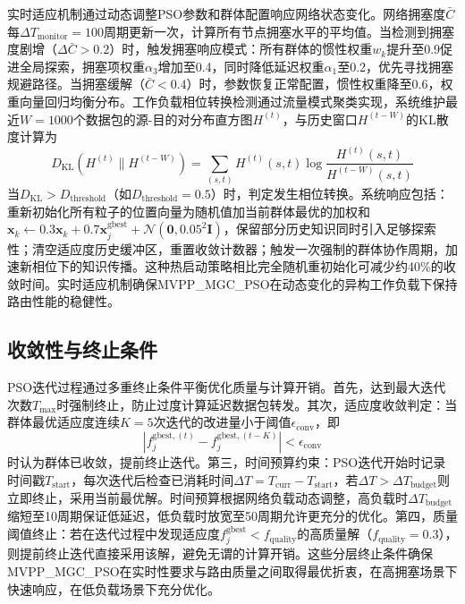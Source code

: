 \documentclass[11pt,a4paper]{article}
\begin{document}
实时适应机制通过动态调整PSO参数和群体配置响应网络状态变化。网络拥塞度$\bar{C}$每$\Delta T_{\text{monitor}} = 100$周期更新一次，计算所有节点拥塞水平的平均值。当检测到拥塞度剧增（$\Delta \bar{C} > 0.2$）时，触发拥塞响应模式：所有群体的惯性权重$w_k$提升至0.9促进全局探索，拥塞项权重$\alpha_3$增加至0.4，同时降低延迟权重$\alpha_1$至0.2，优先寻找拥塞规避路径。当拥塞缓解（$\bar{C} < 0.4$）时，参数恢复正常配置，惯性权重降至0.6，权重向量回归均衡分布。工作负载相位转换检测通过流量模式聚类实现，系统维护最近$W = 1000$个数据包的源-目的对分布直方图$H^{(t)}$，与历史窗口$H^{(t-W)}$的KL散度计算为
\begin{equation}
D_{\text{KL}}(H^{(t)} \| H^{(t-W)}) = \sum_{(s,t)} H^{(t)}(s,t) \log \frac{H^{(t)}(s,t)}{H^{(t-W)}(s,t)}
\end{equation}
当$D_{\text{KL}} > D_{\text{threshold}}$（如$D_{\text{threshold}} = 0.5$）时，判定发生相位转换。系统响应包括：重新初始化所有粒子的位置向量为随机值加当前群体最优的加权和$\mathbf{x}_k \leftarrow 0.3 \mathbf{x}_k + 0.7 \mathbf{x}_j^{\text{gbest}} + \mathcal{N}(\mathbf{0}, 0.05^2 \mathbf{I})$，保留部分历史知识同时引入足够探索性；清空适应度历史缓冲区，重置收敛计数器；触发一次强制的群体协作周期，加速新相位下的知识传播。这种热启动策略相比完全随机重初始化可减少约40\%的收敛时间。实时适应机制确保MVPP\_MGC\_PSO在动态变化的异构工作负载下保持路由性能的稳健性。

\subsection{收敛性与终止条件}

PSO迭代过程通过多重终止条件平衡优化质量与计算开销。首先，达到最大迭代次数$T_{\max}$时强制终止，防止过度计算延迟数据包转发。其次，适应度收敛判定：当群体最优适应度连续$K = 5$次迭代的改进量小于阈值$\epsilon_{\text{conv}}$，即
\begin{equation}
|f_j^{\text{gbest},(t)} - f_j^{\text{gbest},(t-K)}| < \epsilon_{\text{conv}}
\end{equation}
时认为群体已收敛，提前终止迭代。第三，时间预算约束：PSO迭代开始时记录时间戳$T_{\text{start}}$，每次迭代后检查已消耗时间$\Delta T = T_{\text{curr}} - T_{\text{start}}$，若$\Delta T > \Delta T_{\text{budget}}$则立即终止，采用当前最优解。时间预算根据网络负载动态调整，高负载时$\Delta T_{\text{budget}}$缩短至10周期保证低延迟，低负载时放宽至50周期允许更充分的优化。第四，质量阈值终止：若在迭代过程中发现适应度$f_j^{\text{gbest}} < f_{\text{quality}}$的高质量解（$f_{\text{quality}} = 0.3$），则提前终止迭代直接采用该解，避免无谓的计算开销。这些分层终止条件确保MVPP\_MGC\_PSO在实时性要求与路由质量之间取得最优折衷，在高拥塞场景下快速响应，在低负载场景下充分优化。
\end{document}
